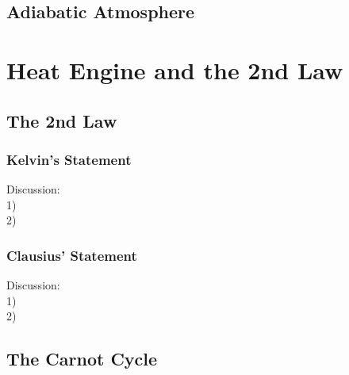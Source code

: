 \documentclass[UTF8]{ctexart} %
\numberwithin{equation}{subsection}
\begin{document}
\subsection{Adiabatic Atmosphere}


\section{Heat Engine and the 2nd Law}
\subsection{The 2nd Law}
\subsubsection{Kelvin's Statement}
Discussion:\\
1) \\
2) \\
\subsubsection{Clausius' Statement}
Discussion:\\
1) \\
2) \\
\subsection{The Carnot Cycle}
\end{document}
